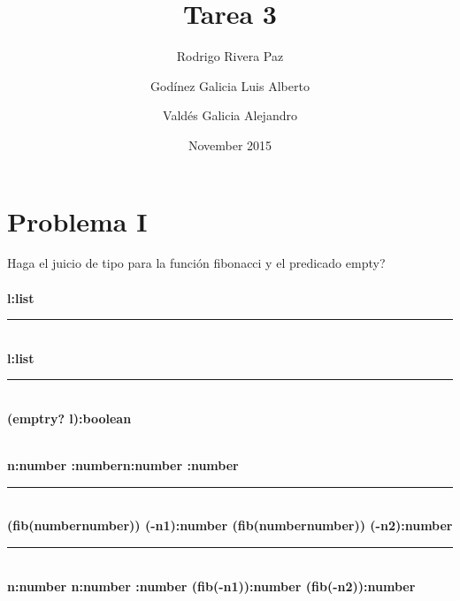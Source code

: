 \documentclass{article}
\title{Tarea 3}
\author{Rodrigo Rivera Paz \and Godínez Galicia Luis Alberto \and Valdés Galicia Alejandro}
\date{November 2015}
\begin{document}
\maketitle

\section{Problema I}
Haga el juicio de tipo para la función fibonacci y el predicado empty?
\\


\\
\newline
\textbf{l:list}


\rule[-2mm]{3cm}{0.1mm}
\\
\newline
\textbf{\Gamma\vdash l:list}


\rule[-2mm]{3cm}{0.1mm}
\\
\newline
\textbf{\Gamma\vdash(emptry? l):boolean}
\newline
\newline
\newline




\\
\newline
\textbf{\Gamm\vdash n:number \hspace{4mm}\Gamm{}:number\hspace{4mm}\Gamm\vdash n:number \hspace{4mm}\Gamm{}:number}

\rule[-2mm]{13cm}{0.1mm}
\\
\newline
\textbf{\Gamma(fib(number\rightarrow number)) \hspace{2mm} \Gamma\vdash (-n1):number \hspace{2mm}\Gamma(fib(number\rightarrow number))\hspace{2mm} \Gamma\vdash (-n2):number}


\rule[-2mm]{18cm}{0.1mm}
\\
\newline
\textbf{\Gamma\vdash n:number \hspace{2cm}\Gamma\vdash n:number \hspace{2mm}\Gamma{}:number \hspace{1cm} \Gamma\vdash(fib(-n1)):number\hspace{2mm} \Gamma\vdash(fib(-n2)):number}
\end{document}
